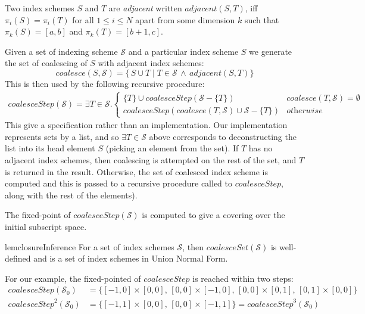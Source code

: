 \newcommand{\contig}[2]{\mathit{adjacent}(#1, #2)}
\begin{defn}[Adjacent]
  \label{def:contiguity}
  Two index schemes $S$ and $T$ are \emph{adjacent} written
  $\contig{S}{T}$, iff $\pi_i(S) = \pi_i(T)$ for all $1 \leq i \leq N$
  apart from some dimension $k$ such that $\pi_k(S) = [a, b]$ and
  $\pi_k(T) = [b+1, c]$.
\end{defn}
%
Given a set of indexing scheme $\mathcal{S}$ and a particular index scheme $S$
we generate the set of coalescing of $S$ with adjacent index schemes:
%
\begin{equation*}
\mathit{coalesce}(S, \mathcal{S}) = 
  \{\,S \cup T \mid T \in \mathcal{S} \, \wedge \,
  \contig{S}{T} \}
\end{equation*}
%
This is then used by the following recursive procedure:
%
\begin{align*}
  \mathit{coalesceStep}(\mathcal{S}) =
  \exists T \in \mathcal{S} . 
  \begin{cases}
    \{T\} \cup \mathit{coalesceStep}(\mathcal{S} - \{T\}) &
    \mathit{coalesce}(T, \mathcal{S}) = \emptyset \\
    \mathit{coalesceStep}(\mathit{coalesce}(T, \mathcal{S}) \cup
                                        \mathcal{S} - \{T\}) & \textit{otherwise}
  \end{cases}
\end{align*}
%
This give a specification rather than an implementation. Our
implementation represents sets by a list, and so
$\exists T \in \mathcal{S}$ above corresponds to deconstructing
the list into its head element $S$ (picking an element from the set).
If $T$ has no adjacent index schemes, then coalescing is attempted on
the rest of the set, and $T$ is returned in the result. Otherwise,
the set of coalesced index scheme is computed and this is passed to
a recursive procedure called to $\mathit{coalesceStep}$, along with the rest of
the elements).

The fixed-point of $\textit{coalesceStep}(\mathcal{S})$ is computed to
give a covering over the initial subscript space.
%
\begin{restatable}{lem}{closureInference}
  \label{lem:closuer-inference}
  For a set of index schemes $\mathcal{S}$, then
  $\mathit{coalesceSet}(\mathcal{S})$ is well-defined and is a set of
  index schemes in Union Normal Form.
\end{restatable}
%
For our example, the fixed-pointed of $\mathit{coalesceStep}$ is reached within two
steps:
%
\begin{align*}
  \mathit{coalesceStep}(\mathcal{S}_0) & =
  \{[-1,0] \times [0,0],\,[0,0] \times [-1, 0],\,[0,0] \times
    [0,1],\,[0,1] \times [0,0]\} \\
  \mathit{coalesceStep}^2(\mathcal{S}_0) & =
  \{[-1, 1] \times [0, 0],\,[0, 0] \times [-1, 1]\} = \mathit{coalesceStep}^3(\mathcal{S}_0)
\end{align*}
%

